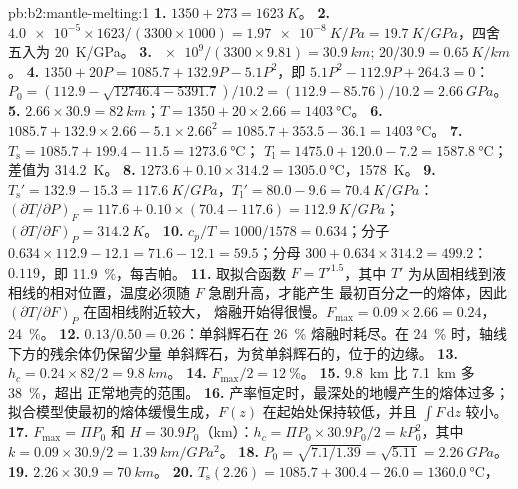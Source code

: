\begin{solution}{pb:b2:mantle-melting:1}
\textbf{1.} $1350 + 273 = \qty{1623}{K}$。
\textbf{2.} $\num{4.0e-5}\times1623/(3300\times1000) = \qty{1.97e-8}{K/Pa} =
\qty{19.7}{K/GPa}$，四舍五入为 \qty{20}{K/GPa}。
\textbf{3.} $\num{e9}/(3300\times9.81) = \qty{30.9}{km}$; $20/30.9 =
\qty{0.65}{K/km}$。
\textbf{4.} $1350 + 20P = 1085.7 + 132.9P - 5.1P^2$，即 $5.1P^2 - 112.9P +
264.3 = 0$：$P_0 = (112.9 - \sqrt{12746.4 - 5391.7})/10.2 = (112.9 - 85.76)/10.2 =
\qty{2.66}{GPa}$。
\textbf{5.} $2.66\times30.9 = \qty{82}{km}$；$T = 1350 + 20\times2.66 =
\qty{1403}{\celsius}$。
\textbf{6.} $1085.7 + 132.9\times2.66 - 5.1\times2.66^2 = 1085.7 + 353.5 - 36.1 =
\qty{1403}{\celsius}$。
\textbf{7.} $T_{\mathrm s} = 1085.7 + 199.4 - 11.5 = \qty{1273.6}{\celsius}$；
$T_{\mathrm l} = 1475.0 + 120.0 - 7.2 = \qty{1587.8}{\celsius}$；差值为
\qty{314.2}{K}。
\textbf{8.} $1273.6 + 0.10\times314.2 = \qty{1305.0}{\celsius}$，\qty{1578}{K}。
\textbf{9.} $T_{\mathrm s}' = 132.9 - 15.3 = \qty{117.6}{K/GPa}$，$T_{\mathrm l}' =
80.0 - 9.6 = \qty{70.4}{K/GPa}$：$(\partial T/\partial P)_F = 117.6 +
0.10\times(70.4 - 117.6) = \qty{112.9}{K/GPa}$；$(\partial T/\partial F)_P =
\qty{314.2}{K}$。
\textbf{10.} $c_p/T = 1000/1578 = 0.634$；分子 $0.634\times112.9 - 12.1 = 71.6
- 12.1 = 59.5$；分母 $300 + 0.634\times314.2 = 499.2$：$0.119$，即
\qty{11.9}{\percent}，每吉帕。
\textbf{11.} 取拟合函数 $F = T'^{1.5}$，其中 $T'$ 为从固相线到液相线的相对位置，温度必须随 $F$ 急剧升高，才能产生
最初百分之一的熔体，因此 $(\partial T/\partial F)_P$ 在固相线附近较大，
熔融开始得很慢。$F_{\max} = 0.09\times2.66 = 0.24$，\qty{24}{\percent}。
\textbf{12.} $0.13/0.50 = 0.26$：单斜辉石在
\qty{26}{\percent} 熔融时耗尽。在 \qty{24}{\percent} 时，轴线下方的残余体仍保留少量
单斜辉石，为贫单斜辉石的，位于的边缘。
\textbf{13.} $h_c = 0.24\times82/2 = \qty{9.8}{km}$。
\textbf{14.} $F_{\max}/2 = \qty{12}{\percent}$。
\textbf{15.} \qty{9.8}{km} 比 \qty{7.1}{km} 多 \qty{38}{\percent}，超出
正常地壳的范围。
\textbf{16.} 产率恒定时，最深处的地幔产生的熔体过多；
拟合模型使最初的熔体缓慢生成，$F(z)$ 在起始处保持较低，并且
$\int F\,\mathrm dz$ 较小。
\textbf{17.} $F_{\max} = \Pi P_0$ 和 $H = 30.9P_0$（km）：$h_c = \Pi P_0\times30.9P_0/2
= kP_0^2$，其中 $k = 0.09\times30.9/2 = \qty{1.39}{km/GPa^2}$。
\textbf{18.} $P_0 = \sqrt{7.1/1.39} = \sqrt{5.11} = \qty{2.26}{GPa}$。
\textbf{19.} $2.26\times30.9 = \qty{70}{km}$。
\textbf{20.} $T_{\mathrm s}(2.26) = 1085.7 + 300.4 - 26.0 = \qty{1360.0}{\celsius}$，

\end{solution}
